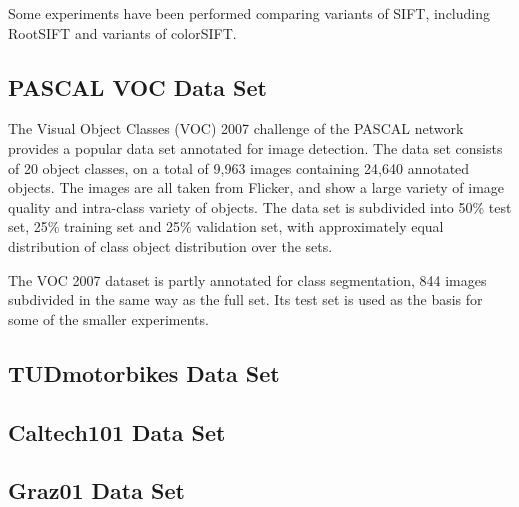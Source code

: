 Some experiments have been performed comparing variants of SIFT, including  RootSIFT\cite{arandjelovic2012three} and variants of colorSIFT\cite{vandeSande2010colorSIFT}.


\subsection{PASCAL VOC Data Set} %

\label{sec:voc_data_set}
The Visual Object Classes (VOC) 2007 challenge of the PASCAL network \cite{pascal-voc-2007} provides a popular data set annotated for image detection. The data set consists of 20 object classes, on a total of 9,963 images containing 24,640 annotated objects. The images are all taken from Flicker, and show a large variety of image quality and intra-class variety of objects. The data set is subdivided into 50\% test set, 25\% training set and 25\% validation set, with approximately equal distribution of class object distribution over the sets.

The VOC 2007 dataset is partly annotated for class segmentation, 844 images subdivided in the same way as the full set. Its test set is used as the basis for some of the smaller experiments.


\subsection{TUDmotorbikes Data Set} %
\label{sec:tudmotorbikes_data_set}


\subsection{Caltech101 Data Set} %
\label{sec:caltech101_data_set}

\subsection{Graz01 Data Set} %
\label{sec:graz01_data_set}

